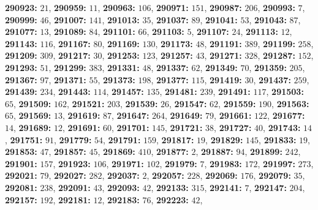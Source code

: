 \textsf{\bfseries 290923:} $21$, \textsf{\bfseries 290959:} $11$, \textsf{\bfseries 290963:} $106$, \textsf{\bfseries 290971:} $151$, \textsf{\bfseries 290987:} $206$, \textsf{\bfseries 290993:} $7$, \textsf{\bfseries 290999:} $46$, \textsf{\bfseries 291007:} $141$, \textsf{\bfseries 291013:} $35$, \textsf{\bfseries 291037:} $89$, \textsf{\bfseries 291041:} $53$, \textsf{\bfseries 291043:} $87$, \textsf{\bfseries 291077:} $13$, \textsf{\bfseries 291089:} $84$, \textsf{\bfseries 291101:} $66$, \textsf{\bfseries 291103:} $5$, \textsf{\bfseries 291107:} $24$, \textsf{\bfseries 291113:} $12$, \textsf{\bfseries 291143:} $116$, \textsf{\bfseries 291167:} $80$, \textsf{\bfseries 291169:} $130$, \textsf{\bfseries 291173:} $48$, \textsf{\bfseries 291191:} $389$, \textsf{\bfseries 291199:} $258$, \textsf{\bfseries 291209:} $309$, \textsf{\bfseries 291217:} $30$, \textsf{\bfseries 291253:} $123$, \textsf{\bfseries 291257:} $43$, \textsf{\bfseries 291271:} $328$, \textsf{\bfseries 291287:} $152$, \textsf{\bfseries 291293:} $51$, \textsf{\bfseries 291299:} $383$, \textsf{\bfseries 291331:} $48$, \textsf{\bfseries 291337:} $62$, \textsf{\bfseries 291349:} $70$, \textsf{\bfseries 291359:} $205$, \textsf{\bfseries 291367:} $97$, \textsf{\bfseries 291371:} $55$, \textsf{\bfseries 291373:} $198$, \textsf{\bfseries 291377:} $115$, \textsf{\bfseries 291419:} $30$, \textsf{\bfseries 291437:} $259$, \textsf{\bfseries 291439:} $234$, \textsf{\bfseries 291443:} $114$, \textsf{\bfseries 291457:} $135$, \textsf{\bfseries 291481:} $239$, \textsf{\bfseries 291491:} $117$, \textsf{\bfseries 291503:} $65$, \textsf{\bfseries 291509:} $162$, \textsf{\bfseries 291521:} $203$, \textsf{\bfseries 291539:} $26$, \textsf{\bfseries 291547:} $62$, \textsf{\bfseries 291559:} $190$, \textsf{\bfseries 291563:} $65$, \textsf{\bfseries 291569:} $13$, \textsf{\bfseries 291619:} $87$, \textsf{\bfseries 291647:} $264$, \textsf{\bfseries 291649:} $79$, \textsf{\bfseries 291661:} $122$, \textsf{\bfseries 291677:} $14$, \textsf{\bfseries 291689:} $12$, \textsf{\bfseries 291691:} $60$, \textsf{\bfseries 291701:} $145$, \textsf{\bfseries 291721:} $38$, \textsf{\bfseries 291727:} $40$, \textsf{\bfseries 291743:} $14$, \textsf{\bfseries 291751:} $91$, \textsf{\bfseries 291779:} $54$, \textsf{\bfseries 291791:} $159$, \textsf{\bfseries 291817:} $19$, \textsf{\bfseries 291829:} $145$, \textsf{\bfseries 291833:} $19$, \textsf{\bfseries 291853:} $47$, \textsf{\bfseries 291857:} $45$, \textsf{\bfseries 291869:} $410$, \textsf{\bfseries 291877:} $2$, \textsf{\bfseries 291887:} $94$, \textsf{\bfseries 291899:} $242$, \textsf{\bfseries 291901:} $157$, \textsf{\bfseries 291923:} $106$, \textsf{\bfseries 291971:} $102$, \textsf{\bfseries 291979:} $7$, \textsf{\bfseries 291983:} $172$, \textsf{\bfseries 291997:} $273$, \textsf{\bfseries 292021:} $79$, \textsf{\bfseries 292027:} $282$, \textsf{\bfseries 292037:} $2$, \textsf{\bfseries 292057:} $228$, \textsf{\bfseries 292069:} $176$, \textsf{\bfseries 292079:} $35$, \textsf{\bfseries 292081:} $238$, \textsf{\bfseries 292091:} $43$, \textsf{\bfseries 292093:} $42$, \textsf{\bfseries 292133:} $315$, \textsf{\bfseries 292141:} $7$, \textsf{\bfseries 292147:} $204$, \textsf{\bfseries 292157:} $192$, \textsf{\bfseries 292181:} $12$, \textsf{\bfseries 292183:} $76$, \textsf{\bfseries 292223:} $42$, 
